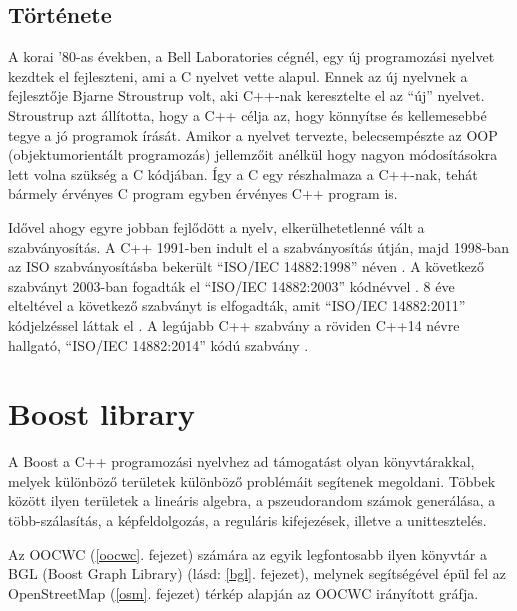 \documentclass[a4paper,12pt]{report}
\begin{document}


\subsection{Története}
\label{cpphistory}

A korai '80-as években, a Bell Laboratories cégnél, egy új programozási nyelvet kezdtek el fejleszteni, ami a C nyelvet vette alapul. Ennek az új nyelvnek a fejlesztője Bjarne Stroustrup volt, aki C++-nak keresztelte el az ``új'' nyelvet. Stroustrup azt állította, hogy a C++ célja az, hogy könnyítse és kellemesebbé tegye a jó programok írását. Amikor a nyelvet tervezte, belecsempészte az OOP (objektumorientált programozás) jellemzőit anélkül hogy nagyon módosításokra lett volna szükség a C kódjában. Így a C egy részhalmaza a C++-nak, tehát bármely érvényes C program egyben érvényes C++ program is.

\vspace{2mm}
Idővel ahogy egyre jobban fejlődött a nyelv, elkerülhetetlenné vált a szabványosítás. A C++ 1991-ben indult el a szabványosítás útján, majd 1998-ban az ISO szabványosításba bekerült ``ISO/IEC 14882:1998'' néven \cite{c++98}. A következő szabványt 2003-ban fogadták el ``ISO/IEC 14882:2003'' kódnévvel \cite{c++03}. 8 éve elteltével a következő szabványt is elfogadták, amit ``ISO/IEC 14882:2011'' kódjelzéssel láttak el \cite{c++11}. A legújabb C++ szabvány a röviden C++14 névre hallgató, ``ISO/IEC 14882:2014'' kódú szabvány \cite{c++14}.

\section{Boost library}
\label{boost}

\vspace{2mm}
A Boost a C++ programozási nyelvhez ad támogatást olyan könyvtárakkal, melyek különböző területek különböző problémáit segítenek megoldani. Többek között ilyen területek a lineáris algebra, a pszeudorandom számok generálása, a több-szálasítás, a képfeldolgozás, a reguláris kifejezések, illetve a unittesztelés. 

\vspace{2mm}
Az OOCWC (\ref{oocwc}. fejezet) számára az egyik legfontosabb ilyen könyvtár a BGL (Boost Graph Library) \cite{bgl} (lásd: \ref{bgl}. fejezet), melynek segítségével épül fel az OpenStreetMap \cite{osm} (\ref{osm}. fejezet) térkép alapján az OOCWC irányított gráfja.
\end{document}
